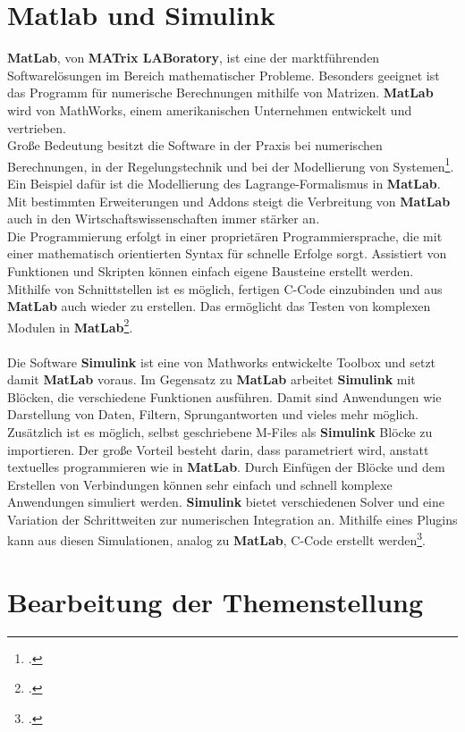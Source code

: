 \documentclass[12pt,a4paper]{scrartcl}	%
\begin{document}
\section{Matlab und Simulink}
\textbf{MatLab}, von \textbf{MATrix LABoratory}, ist eine der marktführenden Softwarelösungen im Bereich mathematischer Probleme. Besonders geeignet ist das Programm für numerische Berechnungen mithilfe von Matrizen. \textbf{MatLab} wird von MathWorks, einem amerikanischen Unternehmen entwickelt und vertrieben.\\
Große Bedeutung besitzt die Software in der Praxis bei numerischen Berechnungen, in der Regelungstechnik und bei der Modellierung von Systemen\footcite[vgl.][S.62 \psqq]{simu}. Ein Beispiel dafür ist die Modellierung des Lagrange-Formalismus in \textbf{MatLab}. Mit bestimmten Erweiterungen und Addons steigt die Verbreitung von \textbf{MatLab} auch in den Wirtschaftswissenschaften immer stärker an. \\
Die Programmierung erfolgt in einer proprietären Programmiersprache, die mit einer mathematisch orientierten Syntax für schnelle Erfolge sorgt. Assistiert von Funktionen und Skripten können einfach eigene Bausteine erstellt werden.
Mithilfe von Schnittstellen ist es möglich, fertigen C-Code einzubinden und aus \textbf{MatLab} auch wieder zu erstellen. Das ermöglicht das Testen von komplexen Modulen in \textbf{MatLab}\footcite[vgl.][Abruf am 16.08.2018]{matlab}.\\
\\
Die Software \textbf{Simulink} ist eine von Mathworks entwickelte Toolbox und setzt damit \textbf{MatLab} voraus. Im Gegensatz zu \textbf{MatLab} arbeitet \textbf{Simulink} mit Blöcken, die verschiedene Funktionen ausführen. Damit sind Anwendungen wie Darstellung von Daten, Filtern, Sprungantworten und vieles mehr möglich. Zusätzlich ist es möglich, selbst geschriebene M-Files als \textbf{Simulink} Blöcke zu importieren. Der große Vorteil besteht darin, dass parametriert wird, anstatt textuelles programmieren wie in \textbf{MatLab}. Durch Einfügen der Blöcke und dem Erstellen von Verbindungen können sehr einfach und schnell komplexe Anwendungen simuliert werden. \textbf{Simulink} bietet verschiedenen Solver und eine Variation der Schrittweiten zur numerischen Integration an. Mithilfe eines Plugins kann aus diesen Simulationen, analog zu \textbf{MatLab}, C-Code erstellt werden\footcite[vgl.][Abruf am 23.08.2018]{matlab}.


\section{Bearbeitung der Themenstellung}
\end{document}
